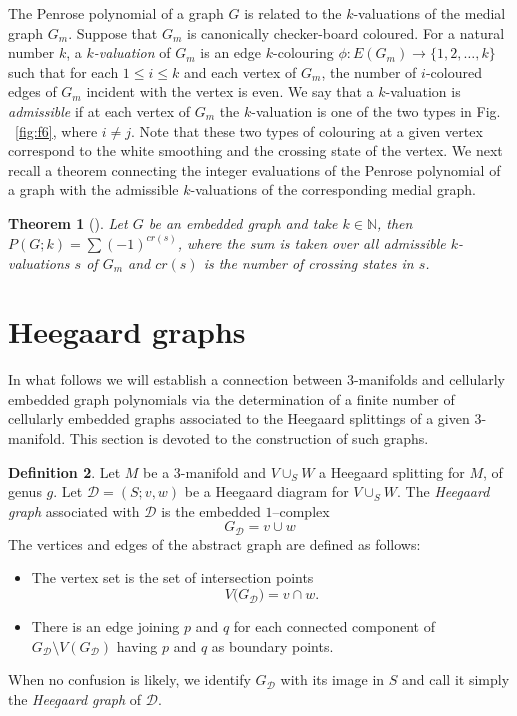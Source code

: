 \documentclass[pdflatex,sn-mathphys-num]{sn-jnl}%
\theoremstyle{plain}
\newtheorem{theorem}{Theorem}
\theoremstyle{definition}
\newtheorem{definition}[theorem]{Definition}
\theoremstyle{remark}
\begin{document}
The Penrose polynomial of a graph $G$ is related to the $k$-valuations of the medial graph $G_m$. Suppose that $G_m$ is canonically checker-board coloured. For a natural number $k$, a \emph{$k$-valuation} of $G_m$ is an edge $k$-colouring $\phi: E(G_m)\rightarrow \{1,2,\ldots, k\}$ such that for each $1\leq i \leq k$ and each vertex of $G_m$, the number of $i$-coloured edges of $G_m$ incident with the vertex is even.  We say that a $k$-valuation is \emph{admissible} if at each vertex of $G_m$ the $k$-valuation is one of the two types in Fig. ~\ref{fig:f6}, where $i\neq j$. Note that these two types of colouring at a given vertex correspond to the white smoothing and the crossing state of the vertex. We next recall a theorem connecting the integer evaluations of the Penrose polynomial of a graph with the admissible $k$-valuations of the corresponding medial graph.    

\begin{theorem}[]\label{teo:val}
Let $G$ be an embedded graph and take $k\in \mathbb{N}$, then $P(G;k)=\sum (-1)^{cr(s)}$, where the sum is taken over all admissible $k$-valuations $s$ of $G_m$ and $cr(s)$ is the number of crossing states in $s$.  
\end{theorem}

\section{Heegaard graphs}\label{heegaardgraphs}

In what follows we will establish a connection between $3$-manifolds and cellularly embedded graph polynomials via the determination of a finite number of cellularly embedded graphs associated to the Heegaard splittings of a given $3$-manifold. This section is devoted to the construction of such graphs.


\begin{definition}%
Let $M$ be a 3-manifold and $V\cup_S W$ a Heegaard splitting for $M$, of genus $g$. Let  $\mathcal D=(S; v,w)$ be a Heegaard diagram for  $V\cup_S W$. The  \emph{Heegaard graph} associated with $\mathcal D$ is the embedded
$1$–complex
$$
G_{\mathcal D}= v\cup w
$$
The vertices and edges of the abstract graph are defined as follows:
\begin{itemize}
\item The vertex set is the set of intersection points
      $$
      V\bigl(G_{\mathcal D}\bigr)= v\cap w .
      $$
\item There is an edge joining $p$ and $q$ for each connected component of $G_{\mathcal D}\setminus V(G_{\mathcal D})$ having $p$ and $q$ as boundary points.
\end{itemize}

When no confusion is likely, we identify $G_{\mathcal D}$ with its image {in} $S$ and call it simply the \emph{Heegaard graph} of $\mathcal{D}$.
\end{definition}
\end{document}
